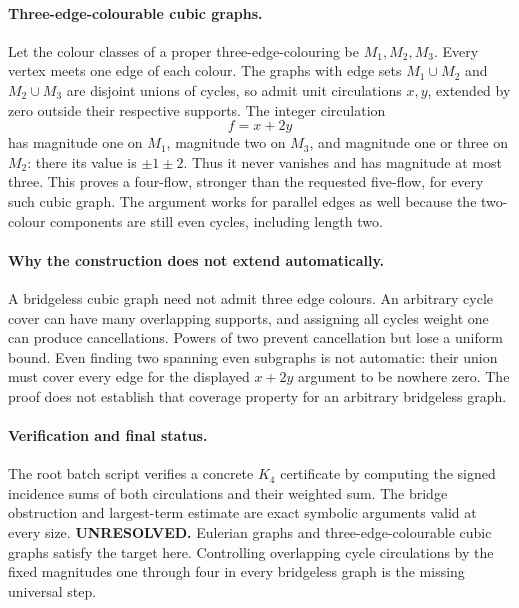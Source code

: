 \documentclass[11pt,a4paper]{article}
\begin{document}
\paragraph{Three-edge-colourable cubic graphs.}
Let the colour classes of a proper three-edge-colouring be $M_1,M_2,M_3$.
Every vertex meets one edge of each colour. The graphs with edge sets
$M_1\cup M_2$ and $M_2\cup M_3$ are disjoint unions of cycles, so admit
unit circulations $x,y$, extended by zero outside their respective supports.
The integer circulation
\[
                         f=x+2y
\]
has magnitude one on $M_1$, magnitude two on $M_3$, and magnitude one
or three on $M_2$: there its value is $\pm1\pm2$. Thus it never vanishes
and has magnitude at most three. This proves a four-flow, stronger than
the requested five-flow, for every such cubic graph. The argument works
for parallel edges as well because the two-colour components are still
even cycles, including length two.

\paragraph{Why the construction does not extend automatically.}
A bridgeless cubic graph need not admit three edge colours. An arbitrary
cycle cover can have many overlapping supports, and assigning all cycles
weight one can produce cancellations. Powers of two prevent cancellation
but lose a uniform bound. Even finding two spanning even subgraphs is
not automatic: their union must cover every edge for the displayed
$x+2y$ argument to be nowhere zero. The proof does not establish that
coverage property for an arbitrary bridgeless graph.

\paragraph{Verification and final status.}
The root batch script verifies a concrete $K_4$ certificate by computing
the signed incidence sums of both circulations and their weighted sum.
The bridge obstruction and largest-term estimate are exact symbolic
arguments valid at every size. \textbf{UNRESOLVED.} Eulerian graphs and
three-edge-colourable cubic graphs satisfy the target here. Controlling
overlapping cycle circulations by the fixed magnitudes one through four
in every bridgeless graph is the missing universal step.
\end{document}
